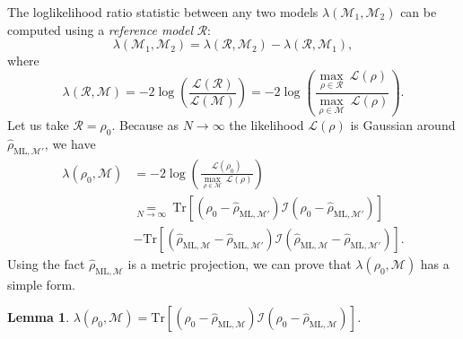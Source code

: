 \documentclass[aps,pra, twocolumn]{revtex4-1}
\newcommand{\M}{\mathcal{M}}
\newcommand{\cL}{\mathcal{L}}
\newcommand{\rhohat}{\hat{\rho}}
\newcommand{\rhoML}[1]{\rhohat_{\scriptscriptstyle{\mathrm{ML},#1}}}
\newtheorem{lem}{Lemma}
\begin{document}
The loglikelihood ratio statistic between any two models $\lambda(\M_{1}, \M_{2})$ can be computed using a \emph{reference model} $\mathcal{R}$: 
\[\lambda(\M_{1}, \M_{2}) = \lambda(\mathcal{R},\M_{2}) - \lambda(\mathcal{R},\M_{1}),\]
where
\[\lambda(\mathcal{R}, \M) = -2 \log \left(\frac{\cL(\mathcal{R})}{\cL(\M)}\right) =  -2 \log \left(\frac{\underset{\rho \in \mathcal{R}}{\max}~\cL(\rho)}{\underset{\rho \in \M}{\max}~\cL(\rho)}\right).\]
Let us take $\mathcal{R} = \rho_{0}$. Because as $N \rightarrow \infty$ the likelihood $\mathcal{L}(\rho)$ is Gaussian around $\rhoML{\M'}$, we have
\begin{align}
\label{eq:lambdalan}
\nonumber \lambda(\rho_{0}, \M)&= -2 \log \left(\frac{\cL(\rho_{0})}{\underset{\rho \in \M}{\max}~\cL(\rho)}\right)\\
\nonumber &\underset{N\rightarrow \infty}{=}~\mathrm{Tr}[(\rho_{0} - \rhoML{\M'})\mathcal{I}(\rho_{0} - \rhoML{\M'})]\\
&-  \mathrm{Tr}[(\rhoML{\M} - \rhoML{\M'})\mathcal{I}(\rhoML{\M} - \rhoML{\M'})].
\end{align}
Using the fact $\rhoML{\M}$ is a metric projection, we can prove that $\lambda(\rho_{0}, \M)$ has a simple form.

\begin{lem}
$\lambda(\rho_{0}, \M) = \mathrm{Tr}[(\rho_{0} - \rhoML{\M})\mathcal{I}(\rho_{0} - \rhoML{\M})]$.
\end{lem}
\end{document}
